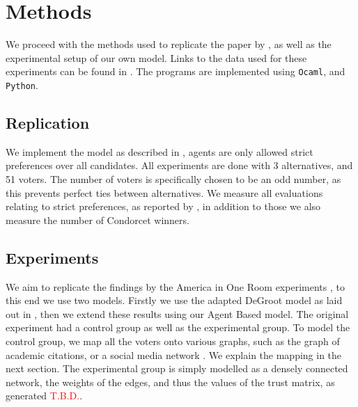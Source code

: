 \chapter{Methods}
\label{Methods}

We proceed with the methods used to replicate the paper by \citet{radDeliberationSinglePeakednessCoherent2021}, as well as the experimental setup of our own model. Links to the data used for these experiments can be found in . The programs are implemented using \texttt{Ocaml}, and \texttt{Python}.


\section{Replication}
We implement the model as described in , agents are only allowed strict preferences over all candidates. All experiments are done with 3 alternatives, and 51 voters. The number of voters is specifically chosen to be an odd number, as this prevents perfect ties between alternatives. We measure all evaluations relating to strict preferences, as reported by \citet{radDeliberationSinglePeakednessCoherent2021}, in addition to those we also measure the number of Condorcet winners.

\section{Experiments}
We aim to replicate the findings by the America in One Room experiments \cite{fishkinCanDeliberationHave2024}, to this end we use two models. Firstly we use the adapted DeGroot model as laid out in , then we extend these results using our Agent Based model. The original experiment had a control group as well as the experimental group. To model the control group, we map all the voters onto various graphs, such as the graph of academic citations, or a social media network \cite{nr}. We explain the mapping in the next section. The experimental group is simply modelled as a densely connected network, the weights of the edges, and thus the values of the trust matrix, as generated \textcolor{red}{T.B.D.}.

